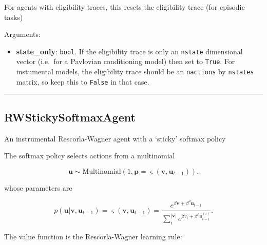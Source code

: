 \begin{Shaded}
\begin{Highlighting}[]
\OperatorTok{=}\NormalTok{)}
\end{Highlighting}
\end{Shaded}

For agents with eligibility traces, this resets the eligibility trace
(for episodic tasks)

Arguments:

\begin{itemize}
\tightlist
\item
  \textbf{state\_only}: \texttt{bool}. If the eligibility trace is only
  an \texttt{nstate} dimensional vector (i.e.~for a Pavlovian
  conditioning model) then set to \texttt{True}. For instumental models,
  the eligibility trace should be an \texttt{nactions} by
  \texttt{nstates} matrix, so keep this to \texttt{False} in that case.
\end{itemize}

\begin{center}\rule{0.5\linewidth}{\linethickness}\end{center}

\subsection{RWStickySoftmaxAgent}\label{rwstickysoftmaxagent}

\begin{Shaded}
\begin{Highlighting}[]
\end{Highlighting}
\end{Shaded}

An instrumental Rescorla-Wagner agent with a `sticky' softmax policy

The softmax policy selects actions from a multinomial

\[
\mathbf u \sim \mathrm{Multinomial}(1, \mathbf p=\varsigma(\mathbf v, \mathbf u_{t-1})).
\]

whose parameters are

\[
p(\mathbf u|\mathbf v, \mathbf u_{t-1}) = \varsigma(\mathbf v, \mathbf u_{t-1}) = \frac{e^{\beta \mathbf v + \beta^\rho \mathbf u_{t-1}}}{\sum_{i}^{|\mathbf v|} e^{\beta v_i + \beta^\rho u_{t-1}^{(i)}}}.
\]

The value function is the Rescorla-Wagner learning rule:

